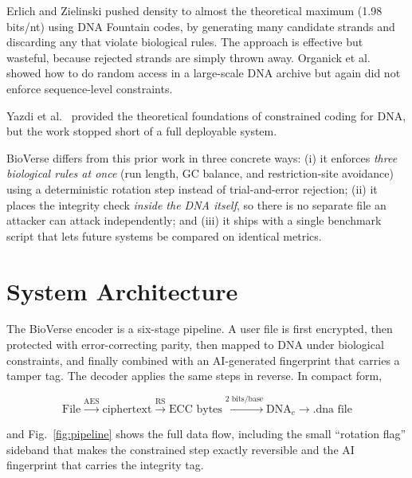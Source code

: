 \documentclass[conference]{IEEEtran}
\begin{document}
Erlich and Zielinski \cite{b4} pushed density to almost the theoretical maximum (1.98 bits/nt) using DNA Fountain codes, by generating many candidate strands and discarding any that violate biological rules. The approach is effective but wasteful, because rejected strands are simply thrown away. Organick et al.\ \cite{b7} showed how to do random access in a large-scale DNA archive but again did not enforce sequence-level constraints.

Yazdi et al.\ \cite{b5} provided the theoretical foundations of constrained coding for DNA, but the work stopped short of a full deployable system.

BioVerse differs from this prior work in three concrete ways: (i) it enforces \emph{three biological rules at once} (run length, GC balance, and restriction-site avoidance) using a deterministic rotation step instead of trial-and-error rejection; (ii) it places the integrity check \emph{inside the DNA itself}, so there is no separate file an attacker can attack independently; and (iii) it ships with a single benchmark script that lets future systems be compared on identical metrics.

\section{System Architecture}

The BioVerse encoder is a six-stage pipeline. A user file is first encrypted, then protected with error-correcting parity, then mapped to DNA under biological constraints, and finally combined with an AI-generated fingerprint that carries a tamper tag. The decoder applies the same steps in reverse. In compact form,

\begin{equation}
\text{File} \xrightarrow{\text{AES}} \text{ciphertext} \xrightarrow{\text{RS}} \text{ECC bytes} \xrightarrow{\text{2 bits/base}} \text{DNA}_c \to \text{.dna file}
\label{eq:pipeline}
\end{equation}

\noindent and Fig.~\ref{fig:pipeline} shows the full data flow, including the small ``rotation flag'' sideband that makes the constrained step exactly reversible and the AI fingerprint that carries the integrity tag.
\end{document}
